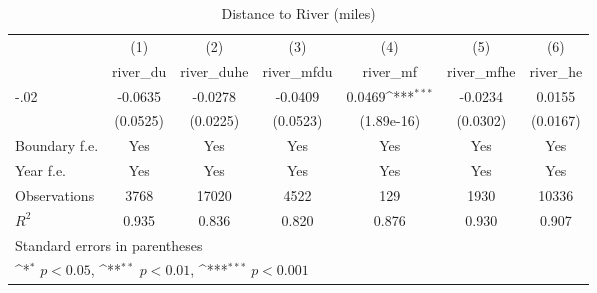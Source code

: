 \begin{table}[htbp]\centering
\def\sym#1{\ifmmode^{#1}\else\(^{#1}\)\fi}
\caption{Distance to River (miles)}
\begin{tabular}{l*{6}{c}}
\hline\hline
                    &\multicolumn{1}{c}{(1)}&\multicolumn{1}{c}{(2)}&\multicolumn{1}{c}{(3)}&\multicolumn{1}{c}{(4)}&\multicolumn{1}{c}{(5)}&\multicolumn{1}{c}{(6)}\\
                    &\multicolumn{1}{c}{river\_du}&\multicolumn{1}{c}{river\_duhe}&\multicolumn{1}{c}{river\_mfdu}&\multicolumn{1}{c}{river\_mf}&\multicolumn{1}{c}{river\_mfhe}&\multicolumn{1}{c}{river\_he}\\
\hline
-.02                &     -0.0635         &     -0.0278         &     -0.0409         &      0.0469\sym{***}&     -0.0234         &      0.0155         \\
                    &    (0.0525)         &    (0.0225)         &    (0.0523)         &  (1.89e-16)         &    (0.0302)         &    (0.0167)         \\
[1em]
Boundary f.e.       &         Yes         &         Yes         &         Yes         &         Yes         &         Yes         &         Yes         \\
[1em]
Year f.e.           &         Yes         &         Yes         &         Yes         &         Yes         &         Yes         &         Yes         \\
\hline
Observations        &        3768         &       17020         &        4522         &         129         &        1930         &       10336         \\
\(R^{2}\)           &       0.935         &       0.836         &       0.820         &       0.876         &       0.930         &       0.907         \\
\hline\hline
\multicolumn{7}{l}{\footnotesize Standard errors in parentheses}\\
\multicolumn{7}{l}{\footnotesize \sym{*} \(p<0.05\), \sym{**} \(p<0.01\), \sym{***} \(p<0.001\)}\\
\end{tabular}
\end{table}
